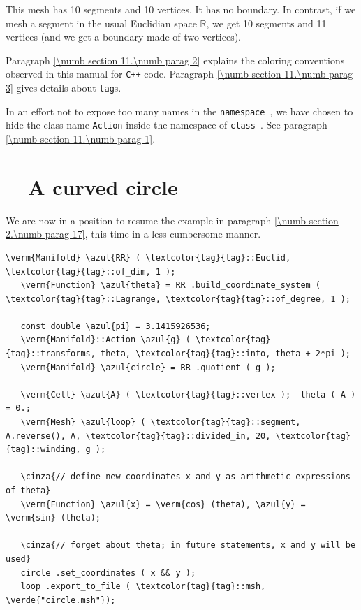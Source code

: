 This mesh has 10 segments and 10 vertices. It has no boundary.
In contrast, if we mesh a segment in the usual Euclidian space $ \mathbb{R} $,
we get 10 segments and 11 vertices (and we get a boundary made of two vertices).

Paragraph \ref{\numb section 11.\numb parag 2} explains the coloring conventions observed
in this manual for {\tt C++} code.
Paragraph \ref{\numb section 11.\numb parag 3} gives details about
{\small\tt\textcolor{tag}{tag}}s.

In an effort not to expose too many names in the {\small\tt namespace },
we have chosen to hide the class name {\small\tt Action} inside the namespace of
{\small\tt class }.
See paragraph \ref{\numb section 11.\numb parag 1}.


\section{~~A curved circle}\label{\numb section 7.\numb parag 2}

We are now in a position to resume the example in paragraph \ref{\numb section 2.\numb parag 17},
this time in a less cumbersome manner.

\begin{Verbatim}[commandchars=\\\{\},formatcom=\small\tt,frame=single,
   label=parag-\ref{\numb section 7.\numb parag 2}.cpp,rulecolor=\color{coment},
   baselinestretch=0.94,framesep=2mm                                            ]
   \verm{Manifold} \azul{RR} ( \textcolor{tag}{tag}::Euclid, \textcolor{tag}{tag}::of_dim, 1 );
   \verm{Function} \azul{theta} = RR .build_coordinate_system ( \textcolor{tag}{tag}::Lagrange, \textcolor{tag}{tag}::of_degree, 1 );

   const double \azul{pi} = 3.1415926536;
   \verm{Manifold}::Action \azul{g} ( \textcolor{tag}{tag}::transforms, theta, \textcolor{tag}{tag}::into, theta + 2*pi );
   \verm{Manifold} \azul{circle} = RR .quotient ( g );

   \verm{Cell} \azul{A} ( \textcolor{tag}{tag}::vertex );  theta ( A ) = 0.;
   \verm{Mesh} \azul{loop} ( \textcolor{tag}{tag}::segment, A.reverse(), A, \textcolor{tag}{tag}::divided_in, 20, \textcolor{tag}{tag}::winding, g );

   \cinza{// define new coordinates x and y as arithmetic expressions of theta}
   \verm{Function} \azul{x} = \verm{cos} (theta), \azul{y} = \verm{sin} (theta);

   \cinza{// forget about theta; in future statements, x and y will be used}
   circle .set_coordinates ( x && y );
   loop .export_to_file ( \textcolor{tag}{tag}::msh, \verde{"circle.msh"});
\end{Verbatim}

